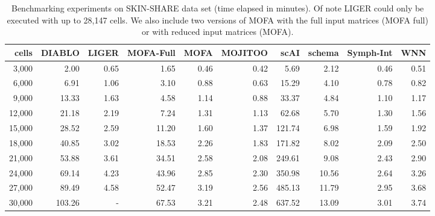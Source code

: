 \begin{table}[ht]
\centering
\caption[Time consumption of MOJITOO]{Benchmarking experiments on SKIN-SHARE data set (time elapsed in minutes). Of note LIGER could only be executed with up to 28,147 cells. We also include  two versions of MOFA with the full input matrices (MOFA full) or with reduced input matrices (MOFA).}
\begin{tabular}{r|rrrrrrrrr}
  \hline
 cells & DIABLO & LIGER & MOFA-Full & MOFA & MOJITOO & scAI & schema & Symph-Int & WNN \\ 
  \hline
  3,000 & 2.00 & 0.65 & 1.65 & 0.46 & 0.42 & 5.69 & 2.12 & 0.46 & 0.51 \\ 
  6,000 & 6.91 & 1.06 & 3.10 & 0.88 & 0.63 & 15.29 & 4.10 & 0.78 & 0.82 \\ 
  9,000 & 13.33 & 1.63 & 4.58 & 1.14 & 0.88 & 33.37 & 4.84 & 1.10 & 1.17 \\ 
  12,000 & 21.18 & 2.19 & 7.24 & 1.31 & 1.13 & 62.68 & 5.70 & 1.30 & 1.56 \\ 
  15,000 & 28.52 & 2.59 & 11.20 & 1.60 & 1.37 & 121.74 & 6.98 & 1.59 & 1.92 \\ 
  18,000 & 40.85 & 3.02 & 18.53 & 2.26 & 1.83 & 171.82 & 8.02 & 2.09 & 2.50 \\ 
  21,000 & 53.88 & 3.61 & 34.51 & 2.58 & 2.08 & 249.61 & 9.08 & 2.43 & 2.90 \\ 
  24,000 & 69.14 & 4.23 & 43.96 & 2.85 & 2.30 & 350.98 & 10.56 & 2.64 & 3.26 \\ 
  27,000 & 89.49 & 4.58 & 52.47 & 3.19 & 2.56 & 485.13 & 11.79 & 2.95 & 3.68 \\ 
  30,000 & 103.26 & - & 67.53 & 3.21 & 2.48 & 637.52 & 13.09 & 3.01 & 3.74 \\ 
   \hline
\end{tabular}
\label{tab:time}
\end{table}


